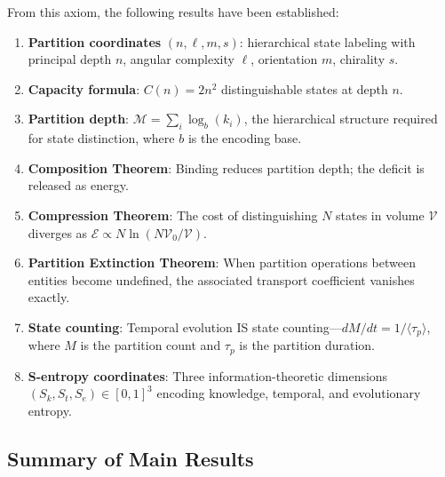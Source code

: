 \documentclass[twocolumn,10pt]{article}
\theoremstyle{remark}
\newcommand{\Depth}{\mathcal{M}}
\newcommand{\Sk}{S_k}
\newcommand{\St}{S_t}
\newcommand{\Se}{S_e}
\newcommand{\Cost}{\mathcal{E}}
\begin{document}
From this axiom, the following results have been established:

\begin{enumerate}[label=(\roman*)]
    \item \textbf{Partition coordinates} $(n, \ell, m, s)$: hierarchical state labeling with principal depth $n$, angular complexity $\ell$, orientation $m$, chirality $s$.
    \item \textbf{Capacity formula}: $C(n) = 2n^2$ distinguishable states at depth $n$.
    \item \textbf{Partition depth}: $\Depth = \sum_i \log_b(k_i)$, the hierarchical structure required for state distinction, where $b$ is the encoding base.
    \item \textbf{Composition Theorem}: Binding reduces partition depth; the deficit is released as energy.
    \item \textbf{Compression Theorem}: The cost of distinguishing $N$ states in volume $\mathcal{V}$ diverges as $\Cost \propto N \ln(N\mathcal{V}_0/\mathcal{V})$.
    \item \textbf{Partition Extinction Theorem}: When partition operations between entities become undefined, the associated transport coefficient vanishes exactly.
    \item \textbf{State counting}: Temporal evolution IS state counting---$dM/dt = 1/\langle\tau_p\rangle$, where $M$ is the partition count and $\tau_p$ is the partition duration.
    \item \textbf{S-entropy coordinates}: Three information-theoretic dimensions $(\Sk, \St, \Se) \in [0,1]^3$ encoding knowledge, temporal, and evolutionary entropy.
\end{enumerate}

\subsection{Summary of Main Results}
\end{document}

